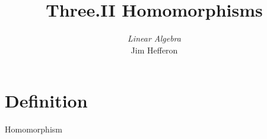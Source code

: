 \documentclass[9pt,t]{beamer}
\title[Homomorphisms] %
{Three.II Homomorphisms}
\author{\textit{Linear Algebra} \\ {\small Jim Hef{}feron}}
\institute{
  \texttt{http://joshua.smcvt.edu/linearalgebra}
}
\date{}
\begin{document}
\begin{frame}
  \titlepage
\end{frame}




\section{Definition}
\begin{frame}{Homomorphism}
\end{frame}




\end{document}
